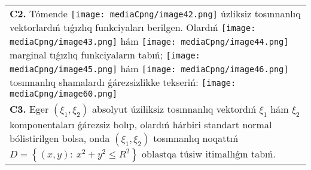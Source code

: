 \documentclass{article}
\begin{document}
\begin{tabular}{m{17cm}}
 \\
\textbf{C2.} Tómende \texttt{[image: mediaCpng/image42.png]} úzliksiz tosınnanlıq vektorlardıń tıǵızlıq funkciyaları berilgen. Olardıń \texttt{[image: mediaCpng/image43.png]} hám \texttt{[image: mediaCpng/image44.png]} marginal tıǵızlıq funkciyaların tabıń; \texttt{[image: mediaCpng/image45.png]} hám \texttt{[image: mediaCpng/image46.png]} tosınnanlıq shamalardı ǵárezsizlikke tekseriń: \texttt{[image: mediaCpng/image60.png]}
 \\
\textbf{C3.} Eger \(\left( \xi_{1},\xi_{2} \right)\) absolyut úziliksiz tosınnanlıq vektordıń \(\xi_{1}\) hám \(\xi_{2}\) komponentaları ǵárezsiz bolıp, olardıń hárbiri standart normal bólistirilgen bolsa, onda \(\left( \xi_{1},\xi_{2} \right)\) tosınnanlıq noqattıń \(D = \left\{ (x,y):\ x^{2} + y^{2} \leq R^{2} \right\}\) oblastqa túsiw itimallıǵın tabıń.
 \\

\end{tabular}
\vspace{1cm}
\end{document}
